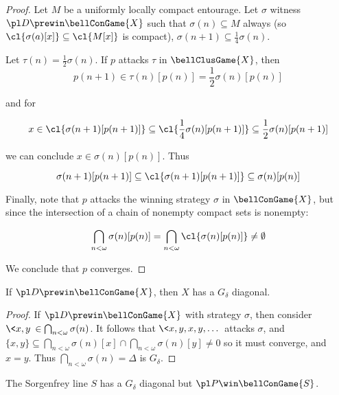 \begin{proof}
  Let $M$ be a uniformly locally compact entourage.
  Let $\sigma$ witness $\pl D\prewin \bellConGame{X}$ such that
  $\sigma(n)\subseteq M$ always
  (so $\cl{\sigma(a)[x]}\subseteq\cl{M[x]}$ is compact),
  $\sigma(n+1)\subseteq\frac{1}{4}\sigma(n)$.

  Let $\tau(n)=\frac{1}{2}\sigma(n)$. If $p$ attacks $\tau$ in
  $\bellClusGame{X}$, then
    \[
      p(n+1)
        \in
      \tau(n)[p(n)]
        =
      \frac{1}{2}\sigma(n)[p(n)]
    \]

    and for

    \[
      x
        \in
      \cl{\sigma(n+1)[p(n+1)]}
        \subseteq
      \cl{\frac{1}{4}\sigma(n)[p(n+1)]}
        \subseteq
      \frac{1}{2}\sigma(n)[p(n+1)]
    \]

  we can conclude $x\in\sigma(n)[p(n)]$. Thus

    \[
      \sigma(n+1)[p(n+1)]
        \subseteq
      \cl{\sigma(n+1)[p(n+1)]}
        \subseteq
      \sigma(n)[p(n)]
    \]

  Finally, note that $p$ attacks the winning strategy $\sigma$ in
  $\bellConGame{X}$, but since the intersection of a chain of nonempty compact
  sets is nonempty:

    \[
      \bigcap_{n<\omega} \sigma(n)[p(n)]
        =
      \bigcap_{n<\omega} \cl{\sigma(n)[p(n)]}
        \not=
      \emptyset
    \]

  We conclude that $p$ converges.
\end{proof}

\begin{prop}
If $\pl D \prewin \bellConGame{X}$, then $X$ has a $G_\delta$ diagonal.
\end{prop}

\begin{proof}
  If $\pl D \prewin \bellConGame{X}$ with strategy $\sigma$, then consider
  $\<x,y\>\in \bigcap_{n<\omega} \sigma(n)$. It follows that
  $\<x,y,x,y,\dots\>$ attacks $\sigma$, and
    $
      \{x,y\}\subseteq \bigcap_{n<\omega}
      \sigma(n)[x]\cap\bigcap_{n<\omega}\sigma(n)[y]
      \not=0
    $
  so it must converge, and $x=y$. Thus
  $\bigcap_{n<\omega}\sigma(n) = \Delta$ is $G_\delta$.
\end{proof}

\begin{ex}
The Sorgenfrey line $S$ has a $G_\delta$ diagonal but $\pl P\win\bellConGame{S}$.
\end{ex}

